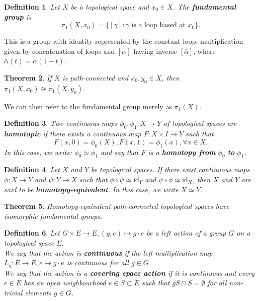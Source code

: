 \documentclass{article}
\newtheorem{theorem}{Theorem}[section]
\newtheorem{definition}[theorem]{Definition}
\begin{document}
\begin{definition}
Let $X$ be a topological space and $x_0\in X$. The \textbf{fundamental group} is \[\pi_1(X,x_0)=\{[\gamma]:\gamma\text{ is a loop based at }x_0\}.\]
\end{definition}
This is a group with identity represented by the constant loop, multiplication given by concatenation of loops and $[\alpha]$ having inverse $[\bar \alpha]$, where $\bar \alpha(t)=\alpha(1-t)$.

\begin{theorem}
If $X$ is path-connected and $x_0,y_0\in X$, then $\pi_1(X,x_0)\cong\pi_1(X,y_0)$.
\end{theorem}
We can then refer to the fundamental group merely as $\pi_1(X)$.

\begin{definition}
Two continuous maps $\phi_0,\phi_1\colon X\to Y$ of topological spaces are \textbf{homotopic} if there exists a continuous map $F\colon X\times I\to Y$ such that\[F(x,0)=\phi_0(X), F(x,1)=\phi_1(x),\forall x\in X.\]
In this case, we write: $\phi_0\simeq\phi_1$ and say that $F$ is a \textbf{homotopy from} $\phi_0$ \textbf{to} $\phi_1$.
\end{definition}



\begin{definition}
Let $X$ and $Y$ be topological spaces. If there exist continuous maps $\phi\colon X\to Y$ and $\psi\colon Y\to X$ such that $\phi\circ\psi\simeq\text{id}_Y$ and $\psi\circ\phi\simeq\text{id}_X$, then $X$ and $Y$ are said to be \textbf{homotopy-equivalent}. In this case, we write $X\simeq Y$.
\end{definition}

\begin{theorem}
Homotopy-equivalent path-connected topological spaces have isomorphic fundamental groups.
\end{theorem}



\begin{definition}
Let $G\times E\to E,(g,e)\mapsto g\cdot e$ be a left action of a group $G$ on a topological space $E$.\\
We say that the action is \textbf{continuous} if the left multiplication map $L_g\colon E\to E,e\mapsto g\cdot e$ is continuous for all $g\in G$.\\
We say that the action is a \textbf{covering space action} if it is continuous and every $e\in E$ has an open neighbourhood $e\in S\subset E$ such that $gS\cap S=\emptyset$ for all non-trivial elements $g\in G$.
\end{definition}
\end{document}
